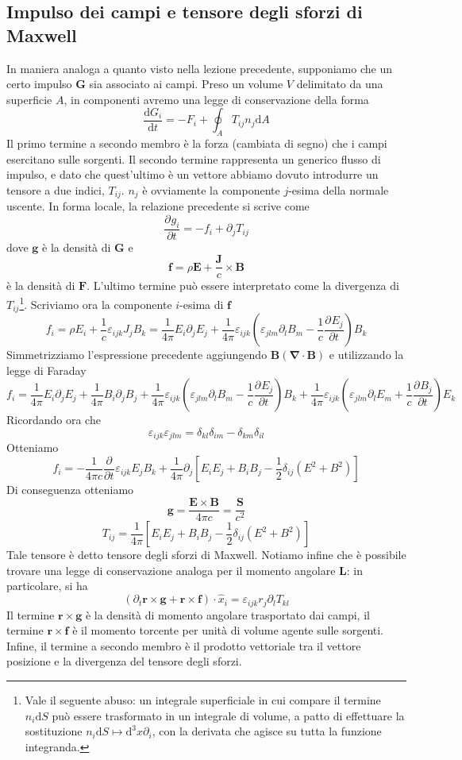 \documentclass[a4paper,11pt]{book}
\newcommand{\dif}{\mathrm{d}}
\newcommand{\der}[3][]{\frac{\partial ^{#1}#2}{\partial {#3}^{#1}}}
\let\oldnabla\nabla
\renewcommand{\nabla}{\vec{\oldnabla}}
\renewcommand{\vec}[1]{\mathbf{#1}}
\theoremstyle{theorem}
\theoremstyle{definition}
\begin{document}
\subsection{Impulso dei campi e tensore degli sforzi di Maxwell}
In maniera analoga a quanto visto nella lezione precedente, supponiamo che un certo impulso $\vec{G}$ sia associato ai campi. Preso un volume $V$ delimitato da una superficie $A$, in componenti avremo una legge di conservazione della forma
\[\frac{\dif G_i}{\dif t}=-F_i+\oint_A T_{ij}n_j\dif A\]
Il primo termine a secondo membro è la forza (cambiata di segno) che i campi esercitano sulle sorgenti. Il secondo termine rappresenta un generico flusso di impulso, e dato che quest'ultimo è un vettore abbiamo dovuto introdurre un tensore a due indici, $T_{ij}$. $n_j$ è ovviamente la componente $j$-esima della normale uscente. In forma locale, la relazione precedente si scrive come
\[\der{g_i}{t}=-f_i+\partial_jT_{ij}\]
dove $\vec{g}$ è la densità di $\vec{G}$ e \[\vec{f}=\rho\vec{E}+\frac{\vec{J}}{c}\times\vec{B}\]
è la densità di $\vec{F}$. L'ultimo termine può essere interpretato come la divergenza di $T_{ij}$\footnote{Vale il seguente abuso: un integrale superficiale in cui compare il termine $n_i\dif S$ può essere trasformato in un integrale di volume, a patto di effettuare la sostituzione $n_i\dif S\mapsto\dif^3x\partial_i$, con la derivata che agisce su tutta la funzione integranda.}. Scriviamo ora la componente $i$-esima di $\vec{f}$
\[f_i=\rho E_i+\frac{1}{c}\varepsilon_{ijk}J_jB_k=\frac{1}{4\pi}E_i\partial_jE_j+\frac{1}{4\pi}\varepsilon_{ijk}\left(\varepsilon_{jlm}\partial_lB_m-\frac{1}{c}\der{E_j}{t}\right)B_k\]
Simmetrizziamo l'espressione precedente aggiungendo $\vec{B}(\nabla\cdot\vec B)$ e utilizzando la legge di Faraday
\[f_i=\frac{1}{4\pi}E_i\partial_jE_j+\frac{1}{4\pi}B_i\partial_jB_j+\frac{1}{4\pi}\varepsilon_{ijk}\left(\varepsilon_{jlm}\partial_lB_m-\frac{1}{c}\der{E_j}{t}\right)B_k+\frac{1}{4\pi}\varepsilon_{ijk}\left(\varepsilon_{jlm}\partial_lE_m+\frac{1}{c}\der{B_j}{t}\right)E_k\]
Ricordando ora che
\[\varepsilon_{ijk}\varepsilon_{jlm}=\delta_{kl}\delta_{im}-\delta_{km}\delta_{il}\]
Otteniamo
\[f_i=-\frac{1}{4\pi c}\der{}{t}\varepsilon_{ijk}E_jB_k+\frac{1}{4\pi}\partial_j\left[E_iE_j+B_iB_j-\frac{1}{2}\delta_{ij}\left(E^2+B^2\right)\right]\]
Di conseguenza otteniamo
\[\vec{g}=\frac{\vec{E}\times\vec{B}}{4\pi c}=\frac{\vec{S}}{c^2}\]
\[T_{ij}=\frac{1}{4\pi}\left[E_iE_j+B_iB_j-\frac{1}{2}\delta_{ij}\left(E^2+B^2\right)\right]\]
Tale tensore è detto tensore degli sforzi di Maxwell. Notiamo infine che è possibile trovare una legge di conservazione analoga per il momento angolare $\vec{L}$: in particolare, si ha
\[(\partial_t\vec{r}\times\vec{g}+\vec{r}\times\vec{f})\cdot\hat{x}_i=\varepsilon_{ijk}r_j\partial_lT_{kl}\]
Il termine $\vec{r}\times\vec{g}$ è la densità di momento angolare trasportato dai campi, il termine $\vec{r}\times\vec{f}$ è il momento torcente per unità di volume agente sulle sorgenti. Infine, il termine a secondo membro è il prodotto vettoriale tra il vettore posizione e la divergenza del tensore degli sforzi.
\end{document}
